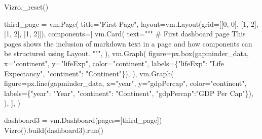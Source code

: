 \documentclass[
  letterpaper,
  DIV=11,
  numbers=noendperiod]{scrreprt}
\newenvironment{Shaded}{\begin{snugshade}}{\end{snugshade}}
\newcommand{\DecValTok}[1]{\textcolor[rgb]{0.68,0.00,0.00}{#1}}
\newcommand{\NormalTok}[1]{\textcolor[rgb]{0.00,0.23,0.31}{#1}}
\newcommand{\OperatorTok}[1]{\textcolor[rgb]{0.37,0.37,0.37}{#1}}
\newcommand{\StringTok}[1]{\textcolor[rgb]{0.13,0.47,0.30}{#1}}
\begin{document}
\begin{Shaded}
\begin{Highlighting}[]
\NormalTok{Vizro.\_reset()}

\NormalTok{third\_page }\OperatorTok{=}\NormalTok{ vm.Page(}
\NormalTok{    title}\OperatorTok{=}\StringTok{"First Page"}\NormalTok{,}
\NormalTok{    layout}\OperatorTok{=}\NormalTok{vm.Layout(grid}\OperatorTok{=}\NormalTok{[[}\DecValTok{0}\NormalTok{, }\DecValTok{0}\NormalTok{], [}\DecValTok{1}\NormalTok{, }\DecValTok{2}\NormalTok{], [}\DecValTok{1}\NormalTok{, }\DecValTok{2}\NormalTok{], [}\DecValTok{1}\NormalTok{, }\DecValTok{2}\NormalTok{]]),}
\NormalTok{    components}\OperatorTok{=}\NormalTok{[}
\NormalTok{        vm.Card(}
\NormalTok{            text}\OperatorTok{=}\StringTok{"""}
\StringTok{                \# First dashboard page}
\StringTok{                This pages shows the inclusion of markdown text in a page and how components}
\StringTok{                can be structured using Layout.}
\StringTok{            """}\NormalTok{,}
\NormalTok{        ),}
\NormalTok{        vm.Graph(}
\NormalTok{            figure}\OperatorTok{=}\NormalTok{px.box(gapminder\_data, x}\OperatorTok{=}\StringTok{"continent"}\NormalTok{, y}\OperatorTok{=}\StringTok{"lifeExp"}\NormalTok{, color}\OperatorTok{=}\StringTok{"continent"}\NormalTok{,}
\NormalTok{                            labels}\OperatorTok{=}\NormalTok{\{}\StringTok{"lifeExp"}\NormalTok{: }\StringTok{"Life Expectancy"}\NormalTok{, }\StringTok{"continent"}\NormalTok{: }\StringTok{"Continent"}\NormalTok{\}),}
\NormalTok{        ),}
\NormalTok{        vm.Graph(}
\NormalTok{            figure}\OperatorTok{=}\NormalTok{px.line(gapminder\_data, x}\OperatorTok{=}\StringTok{"year"}\NormalTok{, y}\OperatorTok{=}\StringTok{"gdpPercap"}\NormalTok{, color}\OperatorTok{=}\StringTok{"continent"}\NormalTok{,}
\NormalTok{                            labels}\OperatorTok{=}\NormalTok{\{}\StringTok{"year"}\NormalTok{: }\StringTok{"Year"}\NormalTok{, }\StringTok{"continent"}\NormalTok{: }\StringTok{"Continent"}\NormalTok{,}
                            \StringTok{"gdpPercap"}\NormalTok{:}\StringTok{"GDP Per Cap"}\NormalTok{\}),}
\NormalTok{            ),}
\NormalTok{    ],}
\NormalTok{)}

\NormalTok{dashboard3 }\OperatorTok{=}\NormalTok{ vm.Dashboard(pages}\OperatorTok{=}\NormalTok{[third\_page])}
\NormalTok{Vizro().build(dashboard3).run()}
\end{Highlighting}
\end{Shaded}
\end{document}
